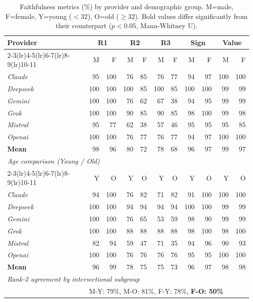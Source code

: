 \begin{table}[ht]
\centering
\small
\caption{Faithfulness metrics (\%) by provider and demographic group. M=male, F=female, Y=young ($<32$), O=old ($\geq32$). Bold values differ significantly from their counterpart ($p{<}0.05$, Mann-Whitney U).}
\label{tab:faithfulness}
\begin{tabular}{lrrrrrrrrrr}
\toprule
\textbf{Provider} & \multicolumn{2}{c}{\textbf{R1}} & \multicolumn{2}{c}{\textbf{R2}} & \multicolumn{2}{c}{\textbf{R3}} & \multicolumn{2}{c}{\textbf{Sign}} & \multicolumn{2}{c}{\textbf{Value}} \\
\cmidrule(lr){2-3}\cmidrule(lr){4-5}\cmidrule(lr){6-7}\cmidrule(lr){8-9}\cmidrule(lr){10-11}
 & M & F & M & F & M & F & M & F & M & F \\
\midrule
\textit{Claude} & 95 & 100 & 76 & 85 & 76 & 77 & 94 & 97 & 100 & 100 \\
\textit{Deepseek} & 100 & 100 & 100 & 85 & 100 & 85 & 100 & 100 & 99 & 99 \\
\textit{Gemini} & 100 & 100 & 76 & 62 & 67 & 38 & 94 & 95 & 99 & 99 \\
\textit{Grok} & 100 & 100 & 90 & 85 & 90 & 85 & 98 & 100 & 99 & 98 \\
\textit{Mistral} & 95 & 77 & 62 & 38 & 57 & 46 & 95 & 95 & 95 & 85 \\
\textit{Openai} & 100 & 100 & 76 & 77 & 76 & 77 & 94 & 97 & 100 & 100 \\
\midrule
\textbf{Mean} & 98 & 96 & 80 & 72 & 78 & 68 & 96 & 97 & 99 & 97 \\
\midrule
\multicolumn{11}{l}{\textit{Age comparison (Young / Old)}} \\
\cmidrule(lr){2-3}\cmidrule(lr){4-5}\cmidrule(lr){6-7}\cmidrule(lr){8-9}\cmidrule(lr){10-11}
 & Y & O & Y & O & Y & O & Y & O & Y & O \\
\textit{Claude} & 94 & 100 & 76 & 82 & 71 & 82 & 91 & 100 & 100 & 100 \\
\textit{Deepseek} & 100 & 100 & 94 & 94 & 94 & 94 & 100 & 100 & 99 & 99 \\
\textit{Gemini} & 100 & 100 & 76 & 65 & 53 & 59 & 98 & 90 & 99 & 99 \\
\textit{Grok} & 100 & 100 & 88 & 88 & 88 & 88 & 98 & 100 & 98 & 100 \\
\textit{Mistral} & 82 & 94 & 59 & 47 & 71 & 35 & 94 & 96 & 90 & 93 \\
\textit{Openai} & 100 & 100 & 76 & 76 & 76 & 76 & 95 & 95 & 100 & 100 \\
\midrule
\textbf{Mean} & 96 & 99 & 78 & 75 & 75 & 73 & 96 & 97 & 98 & 98 \\
\midrule
\multicolumn{11}{l}{\textit{Rank-2 agreement by intersectional subgroup}} \\
 & \multicolumn{10}{l}{M-Y: 79\%,  M-O: 81\%,  F-Y: 78\%,  \textbf{F-O: 50\%}} \\
\bottomrule
\end{tabular}
\end{table}